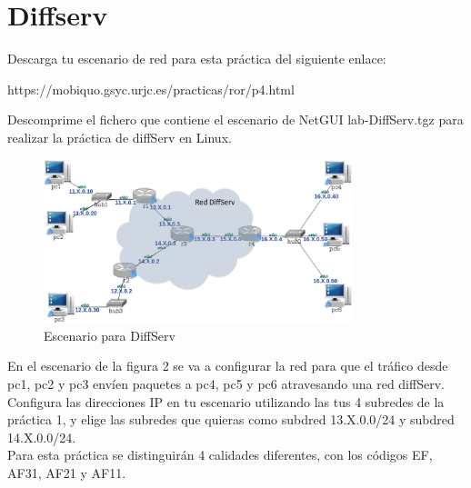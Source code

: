 \documentclass[12pt, a4paper]{report}
\begin{document}
\chapter{Diffserv}
Descarga tu escenario de red para esta práctica del siguiente enlace:

\begin{center}
	https://mobiquo.gsyc.urjc.es/practicas/ror/p4.html
\end{center}

Descomprime el fichero que contiene el escenario de NetGUI lab-DiffServ.tgz para realizar la práctica de diffServ en Linux.\\

\begin{figure}[h]
	\centering
	\includegraphics[width=0.8\textwidth]{enunciado2}
	\caption{Escenario para DiffServ}
\end{figure}

En el escenario de la figura 2 se va a configurar la red para que el tráfico desde pc1, pc2 y pc3
envíen paquetes a pc4, pc5 y pc6 atravesando una red diffServ. Configura las direcciones IP en tu
escenario utilizando las tus 4 subredes de la práctica 1, y elige las subredes que quieras como subdred
13.X.0.0/24 y subdred 14.X.0.0/24.\\

Para esta práctica se distinguirán 4 calidades diferentes, con los códigos EF, AF31, AF21 y AF11.
\end{document}
